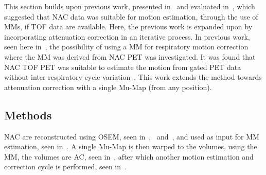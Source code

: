             This section builds upon previous work, presented in~ and evaluated in~, which suggested that \gls{NAC} data was suitable for motion estimation, through the use of \glspl{MM}, if \gls{TOF} data are available. Here, the previous work is expanded upon by incorporating attenuation correction in an iterative process. In previous work, seen here in~, the possibility of using a \gls{MM} for respiratory motion correction where the \gls{MM} was derived from \gls{NAC} \gls{PET} was investigated. It was found that \gls{NAC} \gls{TOF} \gls{PET} was suitable to estimate the motion from gated \gls{PET} data without inter-respiratory cycle variation~\parencite{Whitehead2019ImpactPET}. This work extends the method towards attenuation correction with a single \gls{Mu-Map} (from any position).
        
        \subsection{Methods} \label{sec:pet_ct_respiratory_motion_correction_with_a_single_attenuation_map_using_nac_derived_deformation_fields_methods}
            \gls{NAC} are reconstructed using \gls{OSEM}, seen in~,~ and~, and used as input for \gls{MM} estimation, seen in~. A single \gls{Mu-Map} is then warped to the volumes, using the \gls{MM}, the volumes are \gls{AC}, seen in~, after which another motion estimation and correction cycle is performed, seen in~.
            
